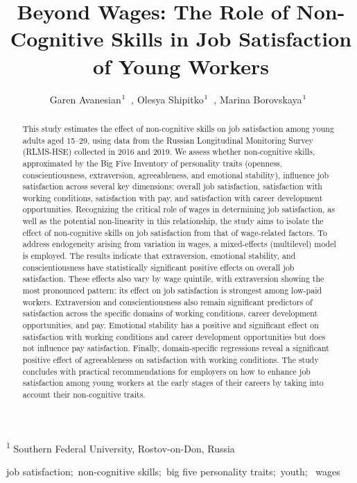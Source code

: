 \documentclass[
]{interact}
\title{Beyond Wages: The Role of Non-Cognitive Skills in Job
Satisfaction of Young Workers}
\author{Garen
Avanesian$\textsuperscript{1}$~\orcidlink{0000-0002-0328-637X}, Olesya
Shipitko$\textsuperscript{1}$~\orcidlink{0000-0003-0786-4146}, Marina
Borovskaya$\textsuperscript{1}$~\orcidlink{0000-0002-8089-183X}}
\begin{document}
\captionsetup{labelsep=space}
\maketitle
\textsuperscript{1}  Southern Federal University, Rostov-on-Don, Russia
\begin{abstract}
This study estimates the effect of non-cognitive skills on job
satisfaction among young adults aged 15--29, using data from the Russian
Longitudinal Monitoring Survey (RLMS-HSE) collected in 2016 and 2019. We
assess whether non-cognitive skills, approximated by the Big Five
Inventory of personality traits (openness, conscientiousness,
extraversion, agreeableness, and emotional stability), influence job
satisfaction across several key dimensions: overall job satisfaction,
satisfaction with working conditions, satisfaction with pay, and
satisfaction with career development opportunities. Recognizing the
critical role of wages in determining job satisfaction, as well as the
potential non-linearity in this relationship, the study aims to isolate
the effect of non-cognitive skills on job satisfaction from that of
wage-related factors. To address endogeneity arising from variation in
wages, a mixed-effects (multilevel) model is employed. The results
indicate that extraversion, emotional stability, and conscientiousness
have statistically significant positive effects on overall job
satisfaction. These effects also vary by wage quintile, with
extraversion showing the most pronounced pattern: its effect on job
satisfaction is strongest among low-paid workers. Extraversion and
conscientiousness also remain significant predictors of satisfaction
across the specific domains of working conditions, career development
opportunities, and pay. Emotional stability has a positive and
significant effect on satisfaction with working conditions and career
development opportunities but does not influence pay satisfaction.
Finally, domain-specific regressions reveal a significant positive
effect of agreeableness on satisfaction with working conditions. The
study concludes with practical recommendations for employers on how to
enhance job satisfaction among young workers at the early stages of
their careers by taking into account their non-cognitive traits.
\end{abstract}
\begin{keywords}
\def\sep{;\ }
job satisfaction\sep non-cognitive skills\sep big five personality
traits\sep youth\sep 
wages
\end{keywords}
\end{document}
